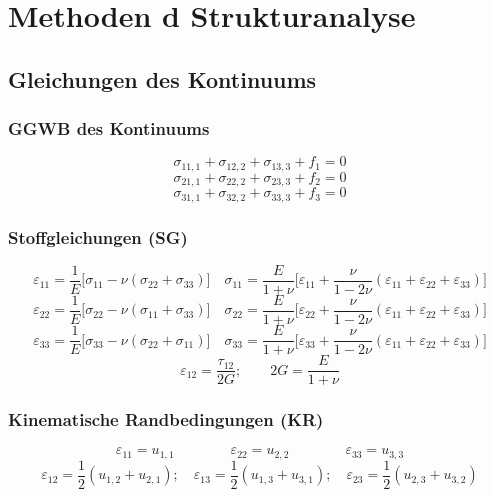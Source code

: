 \section{Methoden d Strukturanalyse}
    \subsection{Gleichungen des Kontinuums}
        \subsubsection{GGWB des Kontinuums}
            \small
            \[\sigma_{11,1} + \sigma_{12,2} + \sigma_{13,3} + f_1 = 0\]
            \[\sigma_{21,1} + \sigma_{22,2} + \sigma_{23,3} + f_2 = 0\]
            \[\sigma_{31,1} + \sigma_{32,2} + \sigma_{33,3} + f_3 = 0\]
            
        \subsubsection{Stoffgleichungen (SG)}
            \vspace{-3mm}
            \[\varepsilon_{11} = \frac{1}{E}\lbrack\sigma_{11} - \nu(\sigma_{22} + \sigma_{33})\rbrack \quad \sigma_{11}=\frac{E}{1+\nu}\lbrack\varepsilon_{11}+\frac{\nu}{1-2\nu}(\varepsilon_{11}+\varepsilon_{22}+\varepsilon_{33})\rbrack\]
            \vspace{-3mm}
            \[\varepsilon_{22} = \frac{1}{E}\lbrack\sigma_{22} - \nu(\sigma_{11} + \sigma_{33})\rbrack \quad \sigma_{22}=\frac{E}{1+\nu}\lbrack\varepsilon_{22}+\frac{\nu}{1-2\nu}(\varepsilon_{11}+\varepsilon_{22}+\varepsilon_{33})\rbrack\]
            \vspace{-1mm}
            \[\varepsilon_{33} = \frac{1}{E}\lbrack\sigma_{33} - \nu(\sigma_{22} + \sigma_{11})\rbrack \quad \sigma_{33}=\frac{E}{1+\nu}\lbrack\varepsilon_{33}+\frac{\nu}{1-2\nu}(\varepsilon_{11}+\varepsilon_{22}+\varepsilon_{33})\rbrack\]
            \[\varepsilon_{12}=\frac{\tau_{12}}{2G}; \qquad 2G=\frac{E}{1+\nu}\]
            
        \subsubsection{Kinematische Randbedingungen (KR)}
            \[\varepsilon_{11} = u_{1,1}\qquad\qquad\varepsilon_{22} = u_{2,2}\qquad\qquad\varepsilon_{33} = u_{3,3}\]
            \[\varepsilon_{12} = \frac{1}{2}(u_{1,2} + u_{2,1});\quad\varepsilon_{13} = \frac{1}{2}(u_{1,3} + u_{3,1});\quad\varepsilon_{23} = \frac{1}{2}(u_{2,3} + u_{3,2})\]
            \normalsize
            \begin{comment}
                \[\varepsilon_{11} = u_{1,1}\quad\quad\quad\quad\varepsilon_{12} = \frac{1}{2}(u_{1,2} + u_{2,1})\]
                \[\varepsilon_{22} = u_{2,2}\quad\quad\quad\quad\varepsilon_{13} = \frac{1}{2}(u_{1,3} + u_{3,1})\]
                \[\varepsilon_{33} = u_{3,3}\quad\quad\quad\quad\varepsilon_{23} = \frac{1}{2}(u_{2,3} + u_{3,2})\]
            \end{comment}
        
    